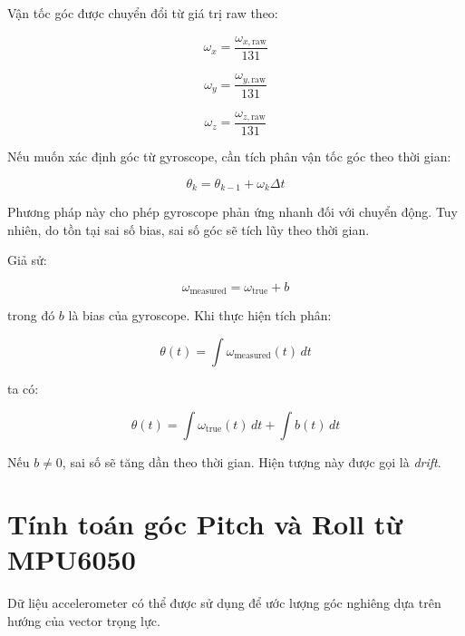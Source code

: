 \documentclass[a4paper,12pt]{report}
\begin{document}
Vận tốc góc được chuyển đổi từ giá trị raw theo:

\begin{equation}
\omega_x =
\frac{\omega_{x,\text{raw}}}{131}
\end{equation}

\begin{equation}
\omega_y =
\frac{\omega_{y,\text{raw}}}{131}
\end{equation}

\begin{equation}
\omega_z =
\frac{\omega_{z,\text{raw}}}{131}
\end{equation}

Nếu muốn xác định góc từ gyroscope, cần tích phân vận tốc góc theo thời gian:

\begin{equation}
\theta_k =
\theta_{k-1} +
\omega_k \Delta t
\end{equation}

Phương pháp này cho phép gyroscope phản ứng nhanh đối với chuyển động. Tuy nhiên, do tồn tại sai số bias, sai số góc sẽ tích lũy theo thời gian.

Giả sử:

\begin{equation}
\omega_{\text{measured}}
=
\omega_{\text{true}} + b
\end{equation}

trong đó $b$ là bias của gyroscope. Khi thực hiện tích phân:

\begin{equation}
\theta(t)
=
\int
\omega_{\text{measured}}(t)\,dt
\end{equation}

ta có:

\begin{equation}
\theta(t)
=
\int \omega_{\text{true}}(t)\,dt
+
\int b(t)\,dt
\end{equation}

Nếu $b \neq 0$, sai số sẽ tăng dần theo thời gian. Hiện tượng này được gọi là \textit{drift}.


\section{Tính toán góc Pitch và Roll từ MPU6050}
\label{sec:pitch-roll}

Dữ liệu accelerometer có thể được sử dụng để ước lượng góc nghiêng dựa trên hướng của vector trọng lực.
\end{document}
